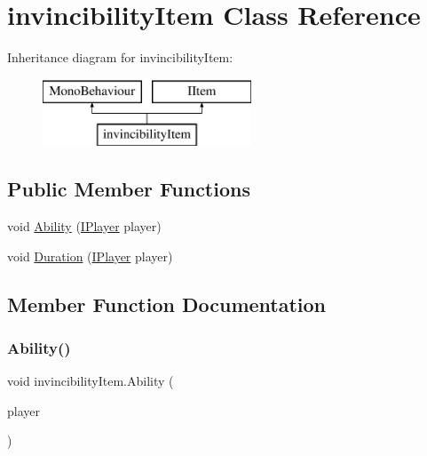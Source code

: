 \hypertarget{classinvincibility_item}{}\section{invincibility\+Item Class Reference}
\label{classinvincibility_item}
Inheritance diagram for invincibility\+Item\+:\begin{figure}[H]
\begin{center}
\leavevmode
\includegraphics[height=2.000000cm]{classinvincibility_item}
\end{center}
\end{figure}
\subsection*{Public Member Functions}
\begin{DoxyCompactItemize}
\item 
void \mbox{\hyperlink{classinvincibility_item_a6fe1d452c0e956c50b4cb468b4bd140b}{Ability}} (\mbox{\hyperlink{class_i_player}{I\+Player}} player)
\item 
void \mbox{\hyperlink{classinvincibility_item_abe2368f3358065d15547f24e8cee2de5}{Duration}} (\mbox{\hyperlink{class_i_player}{I\+Player}} player)
\end{DoxyCompactItemize}


\subsection{Member Function Documentation}
\mbox{\label{classinvincibility_item_a6fe1d452c0e956c50b4cb468b4bd140b}} 
\subsubsection{\texorpdfstring{Ability()}{Ability()}}
{\footnotesize\ttfamily void invincibility\+Item.\+Ability (\begin{DoxyParamCaption}\item[{\mbox{\hyperlink{class_i_player}{I\+Player}}}]{player }\end{DoxyParamCaption})\hspace{0.3cm}{\ttfamily [inline]}}


